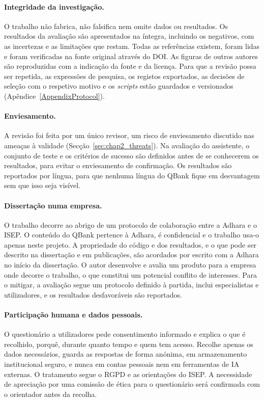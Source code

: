 \paragraph{Integridade da investigação.} O trabalho não fabrica, não falsifica nem omite dados ou resultados. Os resultados da avaliação são apresentados na íntegra, incluindo os negativos, com as incertezas e as limitações que restam. Todas as referências existem, foram lidas e foram verificadas na fonte original através do DOI. As figuras de outros autores são reproduzidas com a indicação da fonte e da licença. Para que a revisão possa ser repetida, as expressões de pesquisa, os registos exportados, as decisões de seleção com o respetivo motivo e os \emph{scripts} estão guardados e versionados (Apêndice~\ref{AppendixProtocol}).

\paragraph{Enviesamento.} A revisão foi feita por um único revisor, um risco de enviesamento discutido nas ameaças à validade (Secção~\ref{sec:chap2_threats}). Na avaliação do assistente, o conjunto de teste e os critérios de sucesso são definidos antes de se conhecerem os resultados, para evitar o enviesamento de confirmação. Os resultados são reportados por língua, para que nenhuma língua do QBank fique em desvantagem sem que isso seja visível.

\paragraph{Dissertação numa empresa.} O trabalho decorre ao abrigo de um protocolo de colaboração entre a Adhara e o ISEP. O conteúdo do QBank pertence à Adhara, é confidencial e o trabalho usa-o apenas neste projeto. A propriedade do código e dos resultados, e o que pode ser descrito na dissertação e em publicações, são acordados por escrito com a Adhara no início da dissertação. O autor desenvolve e avalia um produto para a empresa onde decorre o trabalho, o que constitui um potencial conflito de interesses. Para o mitigar, a avaliação segue um protocolo definido à partida, inclui especialistas e utilizadores, e os resultados desfavoráveis são reportados.

\paragraph{Participação humana e dados pessoais.} O questionário a utilizadores pede consentimento informado e explica o que é recolhido, porquê, durante quanto tempo e quem tem acesso. Recolhe apenas os dados necessários, guarda as respostas de forma anónima, em armazenamento institucional seguro, e nunca em contas pessoais nem em ferramentas de \gls{IA} externas. O tratamento segue o \gls{RGPD} \parencite{eu2016gdpr} e as orientações do ISEP. A necessidade de apreciação por uma comissão de ética para o questionário será confirmada com o orientador antes da recolha.

